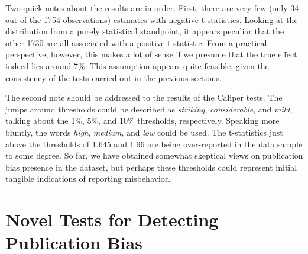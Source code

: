 \begin{table}[!htbp]
\end{table}


Two quick notes about the results are in order. First, there are very few (only 34 out of the 1754 observations) estimates with negative t-statistics. Looking at the distribution from a purely statistical standpoint, it appears peculiar that the other 1730 are all associated with a positive t-statistic. From a practical perspective, however, this makes a lot of sense if we presume that the true effect indeed lies around 7\%. This assumption appears quite feasible, given the consistency of the tests carried out in the previous sections.

The second note should be addressed to the results of the Caliper tests. The jumps around thresholds could be described as \textit{striking}, \textit{considerable}, and \textit{mild}, talking about the 1\%, 5\%, and 10\% thresholds, respectively. Speaking more bluntly, the words \textit{high}, \textit{medium}, and \textit{low} could be used. The t-statistics just above the thresholds of 1.645 and 1.96 are being over-reported in the data sample to some degree. So far, we have obtained somewhat skeptical views on publication bias presence in the dataset, but perhaps these thresholds could represent initial tangible indications of reporting misbehavior.

\section{Novel Tests for Detecting Publication Bias}
\label{sec:phacking}

